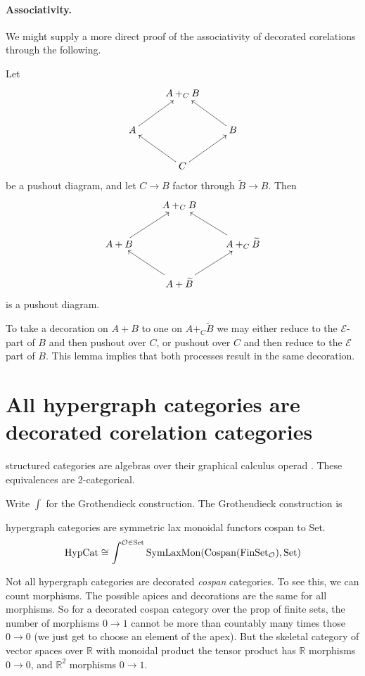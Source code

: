 \paragraph{Associativity.}

We might supply a more direct proof of the associativity of decorated
corelations through the following.
\begin{lemma}
  Let 
  \[
    \xymatrix{
      & A+_CB \\
      A \ar[ur] && B \ar[ul] \\
      & C \ar[ul] \ar[ur]
    }
  \]
  be a pushout diagram, and let $C \to B$ factor through $\widetilde B \to B$.
  Then
  \[
    \xymatrix{
      & A+_CB \\
      A+B \ar[ur] && A+_C \widetilde B \ar[ul] \\
      & A+\widetilde B \ar[ul] \ar[ur]
    }
  \]
  is a pushout diagram.
\end{lemma}

To take a decoration on $A+B$ to one on $A+_C\widetilde B$ we may either reduce to
the $\mathcal E$-part of $B$ and then pushout over $C$, or pushout over $C$ and
then reduce to the $\mathcal E$ part of $B$. This lemma implies that both
processes result in the same decoration.




\section{All hypergraph categories are decorated corelation categories}
structured categories are algebras over their graphical calculus operad
\cite{SSR}. These equivalences are 2-categorical.

Write $\int$ for the Grothendieck construction. The Grothendieck construction
is

\begin{theorem}
hypergraph categories are symmetric lax monoidal functors cospan to Set.
\[
  \mathrm{HypCat} \cong \int^{\mathcal O \in \mathrm{Set}}
  \mathrm{SymLaxMon}(\operatorname{{Cospan}}(\mathrm{FinSet}_{\mathcal O}), \mathrm{Set})
\]
\end{theorem}
\cite{SV}
\begin{remark}
Not all hypergraph categories are decorated \emph{cospan} categories. To see
this, we can count morphisms. The possible apices and decorations are the same
for all morphisms. So for a decorated cospan category over the prop of finite
sets, the number of morphisms $0 \to 1$ cannot be more than countably many times
those $0 \to 0$ (we just get to choose an element of the apex). But the skeletal
category of vector spaces over $\mathbb{R}$ with monoidal product the tensor
product has $\mathbb{R}$ morphisms $0 \to 0$, and $\mathbb{R}^2$ morphisms $0
\to 1$.
\end{remark}

